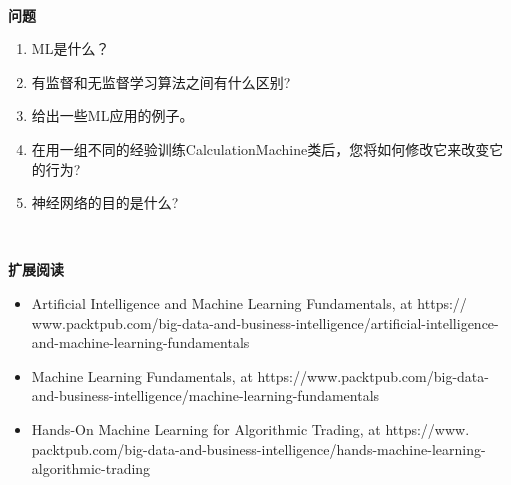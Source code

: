 \noindent\textbf{}\ \par
\textbf{问题} \ \par
\begin{enumerate}
	\item ML是什么？
	\item 有监督和无监督学习算法之间有什么区别?
	\item 给出一些ML应用的例子。
	\item 在用一组不同的经验训练CalculationMachine类后，您将如何修改它来改变它的行为?
	\item 神经网络的目的是什么?
\end{enumerate}

\noindent\textbf{}\ \par
\textbf{扩展阅读} \ \par
\begin{itemize}
	\item Artificial Intelligence and Machine Learning Fundamentals, at  https:/​/​www.packtpub.​com/​big-​data-​and-​business-​intelligence/​artificial-intelligence-​and-​machine-​learning-​fundamentals
	\item Machine Learning Fundamentals, at  https:/​/​www.​packtpub.​com/​big-​data-​and-business-​intelligence/​machine-​learning-​fundamentals
	\item Hands-On Machine Learning for Algorithmic Trading, at  https:/​/​www.​packtpub.com/​big-​data-​and-​business-​intelligence/​hands-​machine-​learning-algorithmic-​trading
\end{itemize}

\newpage















